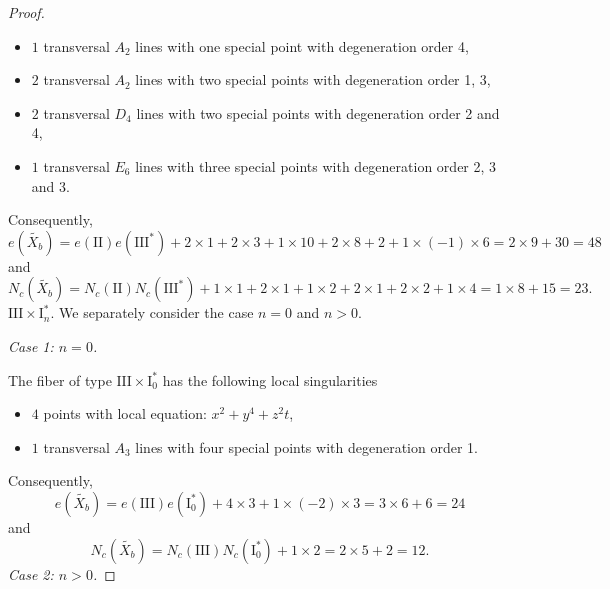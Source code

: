 \documentclass[a4paper]{amsart}
\theoremstyle{plain}
\theoremstyle{definition}
\theoremstyle{remark}
\numberwithin{equation}{section}
\begin{document}
\begin{proof}
\begin{itemize}
	\item [] $1$ transversal $A_{2}$ lines with one special point with degeneration order 4,
	\item [] $2$ transversal $A_{2}$ lines with two special points with degeneration order 1, 3,
	\item [] $2$ transversal $D_{4}$ lines with two special points with degeneration order 2 and 4,
	\item [] $1$ transversal $E_{6}$ lines with three special points with degeneration order 2, 3 and 3.
\end{itemize}
Consequently,
\[
e(\widetilde{X_{b}}) = e(\mathrm{II})e(\mathrm{III}^{*}) + 2\times1 +2 \times 3 + 1\times 10 + 2\times 8 + 2 + 1\times (-1) \times 6  =
2\times 9 + 30 = 48
\]
and
\[
N_{c}(\widetilde{X_{b}}) = N_{c}(\mathrm{II})N_{c}(\mathrm{III}^{*}) +  1\times1 +  2 \times 1 +  1 \times 2 + 2\times 1 + 2 \times 2 + 1 \times 4 = 1\times 8 + 15 = 23.
\]
\medskip
\noindent\emph{$\mathrm{III} \times \mathrm{I}_{n}^{*}$}.
We separately consider the case $n=0$ and $n>0$.

\medskip
\noindent
\emph{Case 1: $n=0$.}

The fiber of type $\mathrm{III} \times \mathrm{I}_{0}^{*}$ has the following local singularities
\begin{itemize}
	\item [] $4$ points with local equation: $x^{2}+y^{4}+z^{2}t$,
	\item [] $1$ transversal $A_{3}$ lines with four  special points with degeneration order 1.
\end{itemize}
Consequently,
\[
e(\widetilde{X_{b}}) = e(\mathrm{III})e(\mathrm{I}_{0}^{*}) + 4\times3 + 1\times(-2)\times 3 = 3\times 6 + 6 = 24
\]
and
\[
N_{c}(\widetilde{X_{b}}) = N_{c}(\mathrm{III})N_{c}(\mathrm{I}_{0}^{*}) +1\times 2  = 2\times 5 + 2  = 12.
\]
\medskip
\noindent
\emph{Case 2: $n>0$.}


\end{proof}
\end{document}
